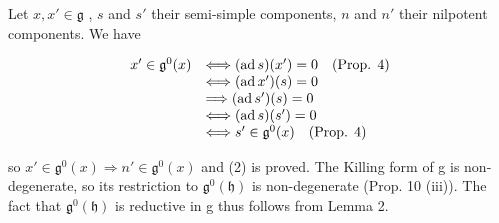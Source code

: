 Let \(x, x' \in \mathfrak{g}\) , \(s\) and \(s'\) their semi-simple components, \(n\) and \(n'\) their nilpotent components. We have

\[
\begin{array}{r l} x ^ {\prime} \in \mathfrak {g} ^ {0} (x) & \Longleftrightarrow (\operatorname{ad} s) (x ^ {\prime}) = 0 \quad \text {(Prop. 4)} \\ & \Longleftrightarrow (\operatorname{ad} x ^ {\prime}) (s) = 0 \\ & \Longrightarrow (\operatorname{ad} s ^ {\prime}) (s) = 0 \\ & \Longleftrightarrow (\operatorname{ad} s) (s ^ {\prime}) = 0 \\ & \Longleftrightarrow s ^ {\prime} \in \mathfrak {g} ^ {0} (x) \quad \text {(Prop. 4)} \end{array}
\]

so \(x' \in \mathfrak{g}^{0}(x) \Rightarrow n' \in \mathfrak{g}^{0}(x)\) and (2) is proved. The Killing form of g is non-degenerate, so its restriction to \(\mathfrak{g}^{0}(\mathfrak{h})\) is non-degenerate (Prop. 10 (iii)). The fact that \(\mathfrak{g}^{0}(\mathfrak{h})\) is reductive in g thus follows from Lemma 2.

